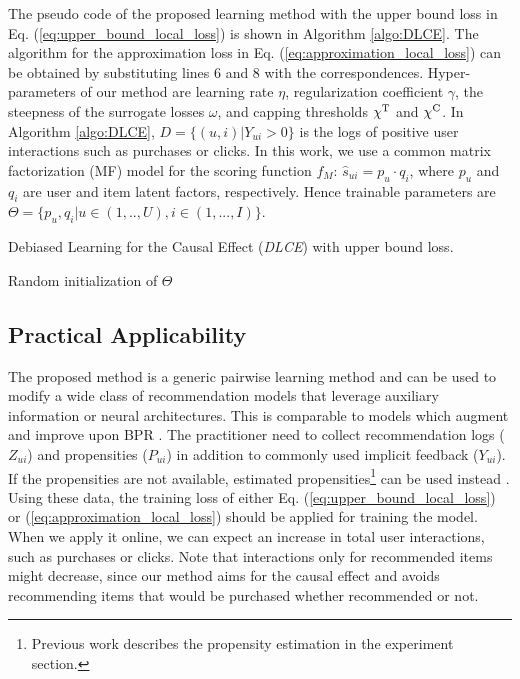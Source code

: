 \documentclass[manuscript,screen]{acmart}
\begin{document}
The pseudo code of the proposed learning method with the upper bound loss in Eq. (\ref{eq:upper_bound_local_loss}) is shown in Algorithm \ref{algo:DLCE}.
The algorithm for the approximation loss in Eq. (\ref{eq:approximation_local_loss}) can be obtained by substituting lines 6 and 8 with the correspondences.
Hyper-parameters of our method are learning rate $\eta$, regularization coefficient $\gamma$, the steepness of the surrogate losses $\omega$, and capping thresholds $\chi^\textnormal{T}$ and $\chi^\textnormal{C}$.
In Algorithm \ref{algo:DLCE}, $D = \{(u,i) |Y_{ui} > 0 \}$ is the logs of positive user interactions such as purchases or clicks.
In this work, we use a common matrix factorization (MF) model \cite{Koren09} for the scoring function $f_M$: $\hat{s}_{ui} = p_u \cdot q_i$,
where $p_u$ and $q_i$ are user and item latent factors, respectively.
Hence trainable parameters are $\Theta = \{p_u, q_i | u \in (1,..,U), i \in (1,...,I) \}$. 

\begin{algorithm}[tp] 
	\caption{Debiased Learning for the Causal Effect ({\textit{DLCE}}) with upper bound loss.}
	\label{algo:DLCE}
	\DontPrintSemicolon
	\KwOut{$\Theta$}
	Random initialization of $\Theta$\;
	\Return{$\Theta$}\;
\end{algorithm}

\subsection{Practical Applicability} 
The proposed method is a generic pairwise learning method and can be used to modify a wide class of recommendation models that leverage auxiliary information or neural architectures.
This is comparable to models which augment and improve upon BPR \cite{Rendle10,He16,Hidasi16}.
The practitioner need to collect recommendation logs ($Z_{ui}$) and propensities ($P_{ui}$) in addition to commonly used implicit feedback ($Y_{ui}$).
If the propensities are not available, estimated propensities\footnote{Previous work \cite{Sato19} describes the propensity estimation in the experiment section.} can be used instead \cite{Hirano03}.
Using these data, the training loss of either Eq. (\ref{eq:upper_bound_local_loss}) or (\ref{eq:approximation_local_loss}) should be applied for training the model. 
When we apply it online, we can expect an increase in total user interactions, such as purchases or clicks.
Note that interactions only for recommended items might decrease, since our method aims for the causal effect and avoids recommending items that would be purchased whether recommended or not.
\end{document}

